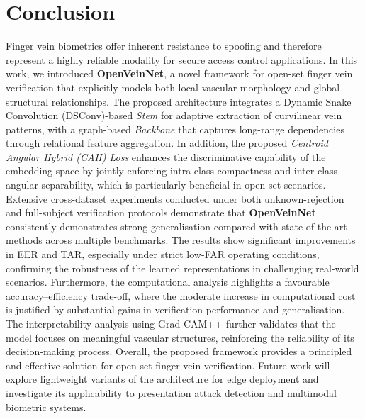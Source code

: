 \documentclass[10pt,journal,compsoc]{IEEEtran}
\begin{document}
\section{Conclusion}
\label{sec:conclusion}
Finger vein biometrics offer inherent resistance to spoofing and therefore represent a highly reliable modality for secure access control applications. In this work, we introduced \textbf{OpenVeinNet}, a novel framework for open-set finger vein verification that explicitly models both local vascular morphology and global structural relationships.
The proposed architecture integrates a Dynamic Snake Convolution (DSConv)-based \emph{Stem} for adaptive extraction of curvilinear vein patterns, with a graph-based \emph{Backbone} that captures long-range dependencies through relational feature aggregation. In addition, the proposed \emph{Centroid Angular Hybrid (CAH) Loss} enhances the discriminative capability of the embedding space by jointly enforcing intra-class compactness and inter-class angular separability, which is particularly beneficial in open-set scenarios.
Extensive cross-dataset experiments conducted under both unknown-rejection and full-subject verification protocols demonstrate that \textbf{OpenVeinNet} consistently demonstrates strong generalisation  compared with state-of-the-art methods across multiple benchmarks. The results show significant improvements in EER and TAR, especially under strict low-FAR operating conditions, confirming the robustness of the learned representations in challenging real-world scenarios.
Furthermore, the computational analysis highlights a favourable accuracy--efficiency trade-off, where the moderate increase in computational cost is justified by substantial gains in verification performance and generalisation. The interpretability analysis using Grad-CAM++ further validates that the model focuses on meaningful vascular structures, reinforcing the reliability of its decision-making process.
Overall, the proposed framework provides a principled and effective solution for open-set finger vein verification. Future work will explore lightweight variants of the architecture for edge deployment and investigate its applicability to presentation attack detection and multimodal biometric systems.


















\end{document}
